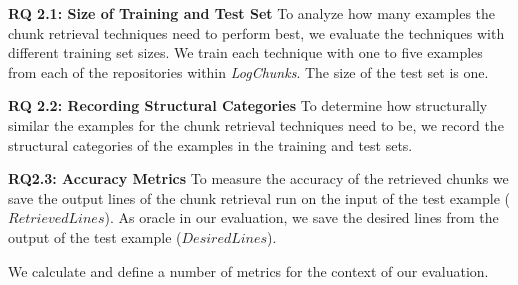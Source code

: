 \noindent %
\textbf{RQ 2.1: Size of Training and Test Set}
To analyze how many examples the chunk retrieval techniques need to
perform best, we evaluate the techniques with different training set
sizes.
We train each technique with one to five examples from each of
the repositories within \emph{LogChunks}.
The size of the test set is
one.

\noindent
\textbf{RQ 2.2: Recording Structural Categories}
To determine how structurally similar the examples for the chunk
retrieval techniques need to be, we record the structural categories
of the examples in the training and test sets.

\noindent
\textbf{RQ2.3: Accuracy Metrics}
To measure the accuracy of the retrieved chunks we save the output
lines of the chunk retrieval run on the input of the test example
($\mathit{RetrievedLines}$).
As oracle in our evaluation, we save the
desired lines from the output of the test example
($\mathit{DesiredLines}$).

We calculate and define a number of metrics for the context of our
evaluation.

